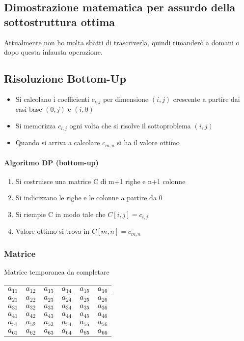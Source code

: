 \subsection{Dimostrazione matematica per assurdo della sottostruttura ottima}
Attualmente non ho molta sbatti di trascriverla, quindi rimanderò a domani o dopo questa
infausta operazione.
\subsection{Risoluzione Bottom-Up}
\begin{itemize}
    \item Si calcolano i coefficienti $c_{i,j}$ per dimensione $(i,j)$ crescente
    a partire dai casi base $(0,j)$ e $(i,0)$
    \item Si memorizza $c_{i,j}$ ogni volta che si risolve il sottoproblema $(i,j)$
    \item Quando si arriva a calcolare $c_{m,n}$ si ha il valore ottimo
\end{itemize}
\paragraph*{Algoritmo DP (bottom-up)}
\begin{enumerate}
    \item Si costruisce una matrice C di m+1 righe e n+1 colonne
    \item Si indicizzano le righe e le colonne a partire da 0
    \item Si riempie C in modo tale che $C[i,j] = c_{i,j}$
    \item Valore ottimo si trova in $C[m,n] = c_{m,n}$
\end{enumerate}
\subsubsection*{Matrice}
Matrice temporanea da completare
\begin{tabular}{|c|c|c|c|c|c|}
    \hline
    $a_{11}$ & $a_{12}$ & $a_{13}$ & $a_{14}$ & $a_{15}$ & $a_{16}$ \\
    \hline
    $a_{21}$ & $a_{22}$ & $a_{23}$ & $a_{24}$ & $a_{25}$ & $a_{26}$ \\
    \hline
    $a_{31}$ & $a_{32}$ & $a_{33}$ & $a_{34}$ & $a_{35}$ & $a_{36}$ \\
    \hline
    $a_{41}$ & $a_{42}$ & $a_{43}$ & $a_{44}$ & $a_{45}$ & $a_{46}$ \\
    \hline
    $a_{51}$ & $a_{52}$ & $a_{53}$ & $a_{54}$ & $a_{55}$ & $a_{56}$ \\
    \hline
    $a_{61}$ & $a_{62}$ & $a_{63}$ & $a_{64}$ & $a_{65}$ & $a_{66}$ \\
    \hline
\end{tabular}
